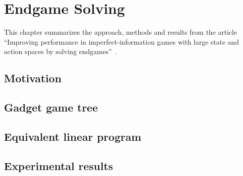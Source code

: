 \chapter{Endgame Solving}

This chapter summarizes the approach, methods and results from the article ``Improving performance in imperfect\hyp{}information games with large state and action spaces by solving endgames''~\cite{GanzfriedSandholm13improving}.

\section{Motivation}

\section{Gadget game tree}

\section{Equivalent linear program}

\section{Experimental results}
